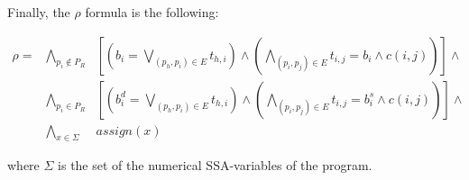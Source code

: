 \documentclass[a4paper,english,titlepage,11pt]{report}
\begin{document}
Finally, the $\rho$ formula is the following:

\begin{eqnarray*}
\rho = & \displaystyle\bigwedge_{p_i \notin P_R}& \left[ \left(b_i = \bigvee_{(p_h,p_i) \in E}
t_{h,i}\right) \wedge \left( \bigwedge_{(p_i,p_j)\in E} t_{i,j} = b_i \wedge
c(i,j)\right)
\right] \wedge \\
 & \displaystyle\bigwedge_{p_i \in P_R}& \left[ \left(b_i^d = \bigvee_{(p_h,p_i) \in E}
 t_{h,i}\right) \wedge \left( \bigwedge_{(p_i,p_j)\in E} t_{i,j} = b_i^s \wedge
 c(i,j)\right) \right] \wedge \\
 & \displaystyle\bigwedge_{x \in \Sigma}& assign(x)
\end{eqnarray*}

where $\Sigma$ is the set of the numerical SSA-variables of the program.
\end{document}
